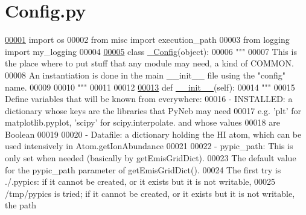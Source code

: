 \hypertarget{_config_8py_source}{}\section{Config.\+py}
\label{_config_8py_source}

\begin{DoxyCode}
\hypertarget{_config_8py_source_l00001}{}\hyperlink{namespacepyneb_1_1utils_1_1_config}{00001} \textcolor{keyword}{import} os
00002 \textcolor{keyword}{from} misc \textcolor{keyword}{import} execution\_path
00003 \textcolor{keyword}{from} logging \textcolor{keyword}{import} my\_logging
00004 
\hypertarget{_config_8py_source_l00005}{}\hyperlink{classpyneb_1_1utils_1_1_config_1_1___config}{00005} \textcolor{keyword}{class }\hyperlink{classpyneb_1_1utils_1_1_config_1_1___config}{\_Config}(object):
00006     \textcolor{stringliteral}{"""}
00007 \textcolor{stringliteral}{    This is the place where to put stuff that any module may need, a kind of COMMON.}
00008 \textcolor{stringliteral}{    An instantiation is done in the main \_\_init\_\_ file using the "config" name.}
00009 \textcolor{stringliteral}{}
00010 \textcolor{stringliteral}{    """}
00011 
00012 
\hypertarget{_config_8py_source_l00013}{}\hyperlink{classpyneb_1_1utils_1_1_config_1_1___config_aa11fc0ec5216188162c802fbe5815fc2}{00013}     \textcolor{keyword}{def }\hyperlink{classpyneb_1_1utils_1_1_config_1_1___config_aa11fc0ec5216188162c802fbe5815fc2}{\_\_init\_\_}(self):
00014         \textcolor{stringliteral}{"""}
00015 \textcolor{stringliteral}{        Define variables that will be known from everywhere:}
00016 \textcolor{stringliteral}{        - INSTALLED: a dictionary whose keys are the libraries that PyNeb may need}
00017 \textcolor{stringliteral}{            e.g. 'plt' for matplotlib.pyplot, 'scipy' for scipy.interpolate. and whose values}
00018 \textcolor{stringliteral}{            are Boolean}
00019 \textcolor{stringliteral}{        }
00020 \textcolor{stringliteral}{        - Datafile: a dictionary holding the HI atom, which can be used intensively in Atom.getIonAbundance}
00021 \textcolor{stringliteral}{        }
00022 \textcolor{stringliteral}{        - pypic\_path: This is only set when needed (basically by getEmisGridDict).}
00023 \textcolor{stringliteral}{            The default value for the pypic\_path parameter of getEmisGridDict().}
00024 \textcolor{stringliteral}{            The first try is ./.pypics: if it cannot be created, or it exists but it is not writable, }
00025 \textcolor{stringliteral}{            /tmp/pypics is tried; if it cannot be created, or it exists but it is not writable, the path}

\end{DoxyCode}
